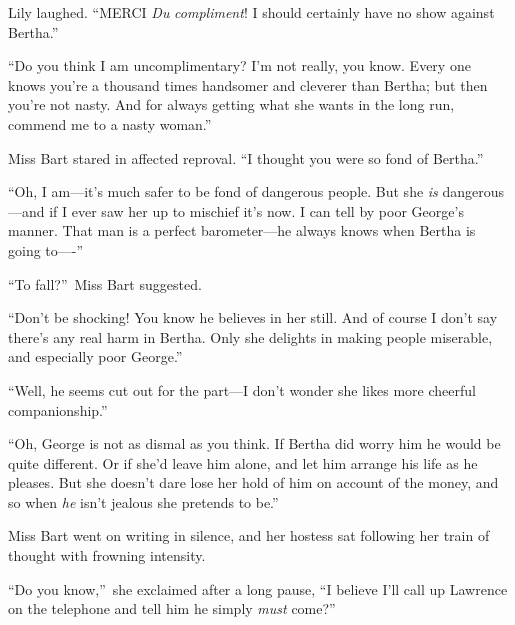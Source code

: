 \documentclass[12pt,a4paper]{book}
\begin{document}
Lily laughed. ``MERCI \textit{Du} \textit{compliment}! I should certainly have no
show against Bertha.''





``Do you think I am uncomplimentary? I'm not really, you know. 
Every one knows you're a thousand times handsomer and cleverer
than Bertha; but then you're not nasty. And for always getting
what she wants in the long run, commend me to a nasty woman.''





Miss Bart stared in affected reproval. ``I thought you were so
fond of Bertha.''





``Oh, I am---it's much safer to be fond of dangerous people. But
she \textit{is} dangerous---and if I ever saw her up to mischief it's now. 
I can tell by poor George's manner. That man is a perfect
barometer---he always knows when Bertha is going to----''





``To fall?''\ Miss Bart suggested.





``Don't be shocking! You know he believes in her still. And of
course I don't say there's any real harm in Bertha. Only she
delights in making people miserable, and especially poor George.''





``Well, he seems cut out for the part---I don't wonder she likes
more cheerful companionship.''





``Oh, George is not as dismal as you think. If Bertha did worry
him he would be quite different. Or if she'd leave him alone, and
let him arrange his life as he pleases. But she doesn't dare lose
her hold of him on account of the money, and so when \textit{he} isn't
jealous she pretends to be.''





Miss Bart went on writing in silence, and her hostess sat
following her train of thought with frowning intensity.





``Do you know,''\ she exclaimed after a long pause, ``I believe I'll
call up Lawrence on the telephone and tell him he simply \textit{must}
come?''
\end{document}
